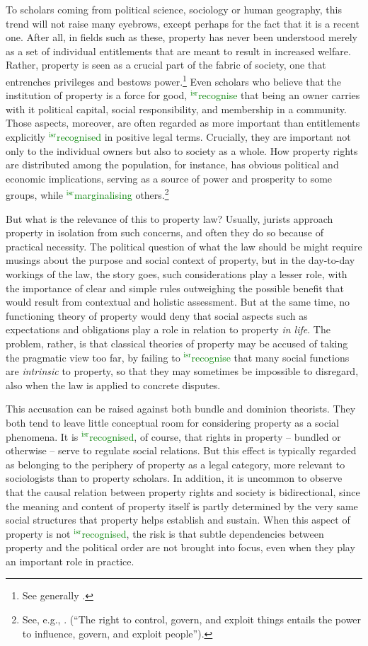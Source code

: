 \documentclass[12pt,a4paper]{book} %
\newcommand{\isr}[1]{\textcolor{green}{$^{\textrm{isr}}${#1}}}
\begin{document}
To scholars coming from political science, sociology or human geography, this trend will not raise many eyebrows, except perhaps for the fact that it is a recent one. After all, in fields such as these, property has never been understood merely as a set of individual entitlements that are meant to result in increased welfare. Rather, property is seen as a crucial part of the fabric of society, one that entrenches privileges and bestows power.\footnote{See generally \cite{carruthers04}.} Even scholars who believe that the institution of property is a force for good, \isr{recognise} that being an owner carries with it political capital, social responsibility, and membership in a community. Those aspects, moreover, are often regarded as more important than entitlements explicitly \isr{recognised} in positive legal terms. Crucially, they are important not only to the individual owners but also to society as a whole. How property rights are distributed among the population, for instance, has obvious political and economic implications, serving as a source of power and prosperity to some groups, while \isr{marginalising} others.\footnote{See, e.g., \cite[23]{carruthers04}. (``The right to control, govern, and exploit things entails the power to influence, govern, and exploit people'').}

But what is the relevance of this to property law? Usually, jurists approach property in isolation from such concerns, and often they do so because of practical necessity. The political question of what the law should be might require musings about the purpose and social context of property, but in the day-to-day workings of the law, the story goes, such considerations play a lesser role, with the importance of clear and simple rules outweighing the possible benefit that would result from contextual and holistic assessment. But at the same time, no functioning theory of  property would deny that social aspects such as expectations and obligations play a role in relation to property {\it in life}. The problem, rather, is that classical theories of property may be accused of taking the pragmatic view too far, by failing to \isr{recognise} that many social functions are {\it intrinsic} to property, so that they may sometimes be impossible to disregard, also when the law is applied to concrete disputes.

This accusation can be raised against both bundle and dominion theorists. They both tend to leave little conceptual room for considering property as a social phenomena. It is \isr{recognised}, of course, that rights in property -- bundled or otherwise -- serve to regulate social relations. But this effect is typically regarded as belonging to the periphery of property as a legal category, more relevant to sociologists than to property scholars. In addition, it is uncommon to observe that the causal relation between property rights and society is bidirectional, since the meaning and content of property itself is partly determined by the very same social structures that property helps establish and sustain. When this aspect of property is not \isr{recognised}, the risk is that subtle dependencies between property and the political order are not brought into focus, even when they play an important role in practice.
\end{document}
